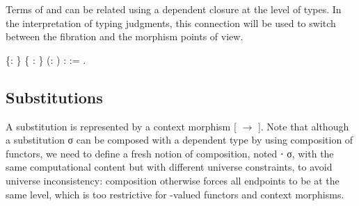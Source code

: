   Terms of   and   can be related using a dependent closure
  at the level of types. In the interpretation of typing judgments, this connection 
  will be used to switch between the fibration and the morphism points of view.
\begin{coqdoccode}
\coqdocemptyline
\coqdocnoindent
{}  \{: \} \{ :  \} (:  )\coqdoceol
\coqdocindent{1.00em}
:   := \coqdocnotation{(} \coqdocvar{$\gamma$} \coqdocnotation{(}   \coqdocnotation{$\star$} \coqdocnotation{(}\coqdocvariable{$\gamma$}\coqdocnotation{;} \coqdocnotation{)} \coqdocnotation{;} \coqdocvar{\_}\coqdocnotation{);}  \coqdocnotation{)}.\coqdoceol
\coqdocemptyline
\end{coqdoccode}


\subsection{Substitutions}




  A substitution is represented by a context morphism [ $\longrightarrow$ ].  Note
  that although a substitution σ can be composed with a dependent type
   by using composition of functors, we need to define a fresh notion
  of composition, noted  ⋅ σ, with the same computational content but
  with different universe constraints, to avoid universe inconsistency:
  composition otherwise forces all endpoints to be at the same level, which
  is too restrictive for -valued functors and context morphisms.


